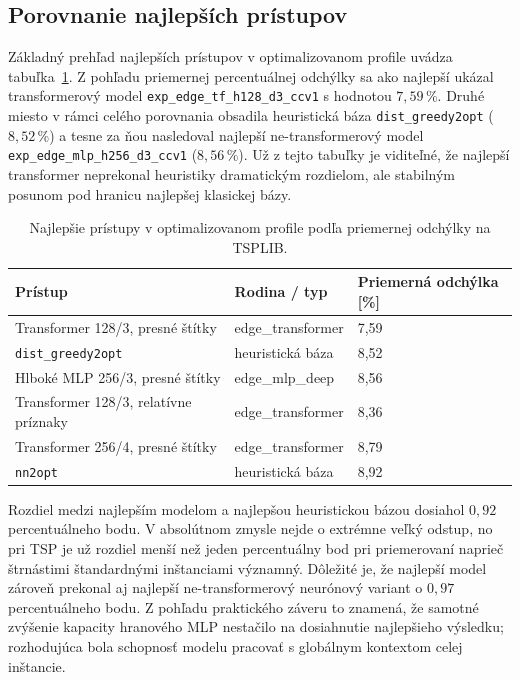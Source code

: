 \subsection{Porovnanie najlepších prístupov}
\indent Základný prehľad najlepších prístupov v optimalizovanom profile uvádza
tabuľka~\ref{tab:optimized_top_methods}. Z pohľadu priemernej percentuálnej
odchýlky sa ako najlepší ukázal transformerový model
\texttt{exp\_edge\_tf\_h128\_d3\_ccv1} s hodnotou \(7{,}59\,\%\). Druhé miesto
v rámci celého porovnania obsadila heuristická báza \texttt{dist\_greedy2opt}
(\(8{,}52\,\%\)) a tesne za ňou nasledoval najlepší ne-transformerový model
\texttt{exp\_edge\_mlp\_h256\_d3\_ccv1} (\(8{,}56\,\%\)). Už z tejto tabuľky je
viditeľné, že najlepší transformer neprekonal heuristiky dramatickým rozdielom,
ale stabilným posunom pod hranicu najlepšej klasickej bázy.

\begin{table}[H]
    \centering
    \footnotesize
    \caption{Najlepšie prístupy v optimalizovanom profile podľa priemernej odchýlky na TSPLIB.}
    \label{tab:optimized_top_methods}
    \begin{tabular}{|p{5.0cm}|p{3.4cm}|p{2.0cm}|}
        \hline
        Prístup & Rodina / typ & Priemerná odchýlka [\%] \\
        \hline
        Transformer 128/3, presné štítky & edge\_transformer & 7,59 \\
        \hline
        \texttt{dist\_greedy2opt} & heuristická báza & 8,52 \\
        \hline
        Hlboké MLP 256/3, presné štítky & edge\_mlp\_deep & 8,56 \\
        \hline
        Transformer 128/3, relatívne príznaky & edge\_transformer & 8,36 \\
        \hline
        Transformer 256/4, presné štítky & edge\_transformer & 8,79 \\
        \hline
        \texttt{nn2opt} & heuristická báza & 8,92 \\
        \hline
    \end{tabular}
    \normalsize
\end{table}

\indent Rozdiel medzi najlepším modelom a najlepšou heuristickou bázou dosiahol
\(0{,}92\) percentuálneho bodu. V absolútnom zmysle nejde o extrémne veľký
odstup, no pri TSP je už rozdiel menší než jeden percentuálny bod pri
priemerovaní naprieč štrnástimi štandardnými inštanciami významný. Dôležité je,
že najlepší model zároveň prekonal aj najlepší ne-transformerový neurónový
variant o \(0{,}97\) percentuálneho bodu. Z pohľadu praktického záveru to
znamená, že samotné zvýšenie kapacity hranového MLP nestačilo na dosiahnutie
najlepšieho výsledku; rozhodujúca bola schopnosť modelu pracovať s globálnym
kontextom celej inštancie.

